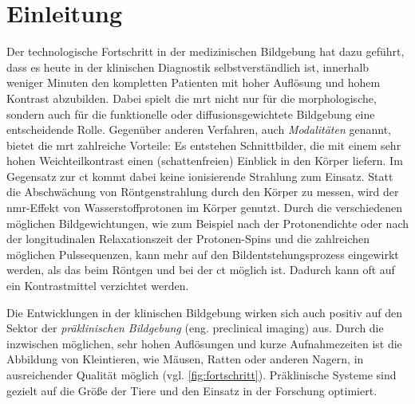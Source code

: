 \chapter{Einleitung}
Der technologische Fortschritt in der medizinischen Bildgebung hat dazu geführt, dass es heute in der klinischen Diagnostik selbstverständlich ist, innerhalb weniger Minuten den kompletten Patienten  mit hoher Auflösung und hohem Kontrast abzubilden.
Dabei spielt die \gls{mrt} nicht nur für die morphologische, sondern auch für die funktionelle oder diffusionsgewichtete Bildgebung eine entscheidende Rolle. Gegenüber anderen Verfahren, auch \textit{Modalitäten} genannt, bietet die \gls{mrt} zahlreiche Vorteile: Es entstehen Schnittbilder, die mit einem sehr hohen Weichteilkontrast einen (schattenfreien) Einblick in den Körper liefern. Im Gegensatz zur \gls{ct} kommt dabei keine ionisierende Strahlung zum Einsatz. Statt die Abschwächung von Röntgenstrahlung durch den Körper zu messen, wird der \gls{nmr}-Effekt von Wasserstoffprotonen im Körper genutzt. Durch die verschiedenen möglichen Bildgewichtungen, wie zum Beispiel nach der Protonendichte oder nach der longitudinalen Relaxationszeit der Protonen-Spins und die zahlreichen möglichen Pulssequenzen, kann mehr auf den Bildentstehungsprozess eingewirkt werden, als das beim Röntgen und bei der \gls{ct} möglich ist. Dadurch kann oft auf ein Kontrastmittel verzichtet werden.

Die Entwicklungen in der klinischen Bildgebung wirken sich auch positiv auf den Sektor der \textit{präklinischen Bildgebung} (eng. preclinical imaging) aus. Durch die inzwischen möglichen, sehr hohen Auflösungen und kurze Aufnahmezeiten ist die Abbildung von Kleintieren, wie Mäusen, Ratten oder anderen Nagern, in ausreichender Qualität möglich (vgl. \autoref{fig:fortschritt}). Präklinische Systeme sind gezielt auf die Größe der Tiere und den Einsatz in der Forschung optimiert.

